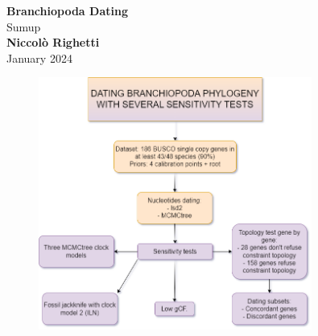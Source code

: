\begin{titlepage}
    \begin{center}
    {\fontsize{40}{48}\selectfont \bfseries Branchiopoda Dating} 
    \\\vspace{20pt}
    {\LARGE Sumup} \\
    \vspace{20pt}
    \textbf{Niccolò Righetti}
    \vspace{8pt}
    \\ January 2024
    \end{center}
    \begin{figure}[ht]
    \centering
    \includegraphics[width=0.8\textwidth]{Figures/Branchio_new_pipeline.drawio.png}
    \end{figure}
\end{titlepage}